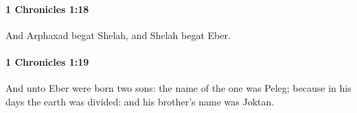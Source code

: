 		\paragraph{1 Chronicles 1:18} %
			\label{1CHRONICLES-1-18}

			And Arphaxad begat Shelah, and Shelah begat Eber.


		\paragraph{1 Chronicles 1:19} %
			\label{1CHRONICLES-1-19}

			And unto Eber were born two sons: the name of the one was Peleg; because in his days the earth was divided: and his brother’s name was Joktan.


